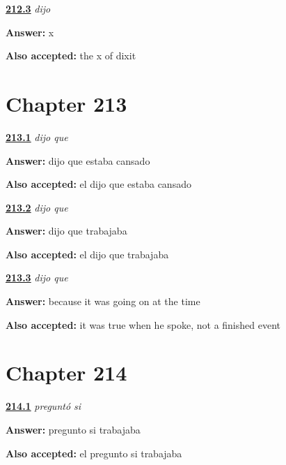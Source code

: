 \noindent\begin{minipage}[t]{\linewidth}
\raggedright
\hyperlink{review-ES-C57-dijo-letter}{\textbf{212.3}} \emph{dijo}\par
\small \textbf{Answer:} x\par
\footnotesize \textbf{Also accepted:} the x of dixit
\end{minipage}\par\medskip

\section*{Chapter 213}

\noindent\begin{minipage}[t]{\linewidth}
\raggedright
\hyperlink{review-ES-C57-dijo-que-shift}{\textbf{213.1}} \emph{dijo que}\par
\small \textbf{Answer:} dijo que estaba cansado\par
\footnotesize \textbf{Also accepted:} el dijo que estaba cansado
\end{minipage}\par\medskip

\noindent\begin{minipage}[t]{\linewidth}
\raggedright
\hyperlink{review-ES-C57-dijo-que-work}{\textbf{213.2}} \emph{dijo que}\par
\small \textbf{Answer:} dijo que trabajaba\par
\footnotesize \textbf{Also accepted:} el dijo que trabajaba
\end{minipage}\par\medskip

\noindent\begin{minipage}[t]{\linewidth}
\raggedright
\hyperlink{review-ES-C57-dijo-que-why}{\textbf{213.3}} \emph{dijo que}\par
\small \textbf{Answer:} because it was going on at the time\par
\footnotesize \textbf{Also accepted:} it was true when he spoke, not a finished event
\end{minipage}\par\medskip

\section*{Chapter 214}

\noindent\begin{minipage}[t]{\linewidth}
\raggedright
\hyperlink{review-ES-C57-pregunto-si-report}{\textbf{214.1}} \emph{preguntó si}\par
\small \textbf{Answer:} pregunto si trabajaba\par
\footnotesize \textbf{Also accepted:} el pregunto si trabajaba
\end{minipage}\par\medskip

